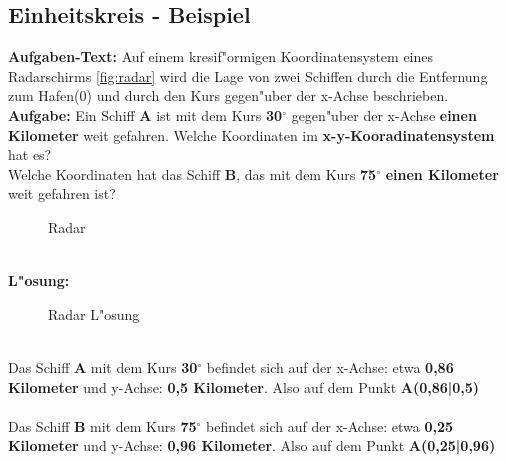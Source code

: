 \documentclass{standalone}
\begin{document}
\subsection{Einheitskreis - Beispiel}

\textbf{Aufgaben-Text:} Auf einem kresif{"o}rmigen Koordinatensystem eines Radarschirms \autoref{fig:radar} wird die Lage von zwei Schiffen durch die Entfernung zum Hafen(0) und durch den Kurs gegen{"u}ber der x-Achse beschrieben. \\
\textbf{Aufgabe:} Ein Schiff \textbf{A} ist mit dem Kurs \textbf{30$^\circ$} gegen{"u}ber der x-Achse \textbf{einen Kilometer} weit gefahren. Welche Koordinaten im \textbf{x-y-Kooradinatensystem} hat es?\\
Welche Koordinaten hat das Schiff \textbf{B}, das mit dem Kurs \textbf{75$^\circ$} \textbf{einen Kilometer} weit gefahren ist?
\begin{figure}[hb!]
	\centering
	\def\svgwidth{250px}
	
	\caption{Radar}
	\label{fig:radar}
\end{figure}
\\
\noindent
\textbf{L{"o}sung:}
\begin{wrapfigure}[9]{r}{0.5\textwidth}
	\def\svgwidth{250px}
	
	\caption{Radar L{"o}sung}
	\label{fig:radar_loesung}
\end{wrapfigure}
\\
Das Schiff \textbf{A} mit dem Kurs \textbf{30$^\circ$} befindet sich auf der x-Achse: etwa \textbf{0,86 Kilometer} und y-Achse: \textbf{0,5 Kilometer}. Also auf dem Punkt \textbf{A(0,86|0,5)} \\  \\
Das Schiff \textbf{B} mit dem Kurs \textbf{75$^\circ$} befindet sich auf der x-Achse: etwa \textbf{0,25 Kilometer} und y-Achse: \textbf{0,96 Kilometer}. Also auf dem Punkt \textbf{A(0,25|0,96)}
\end{document}
